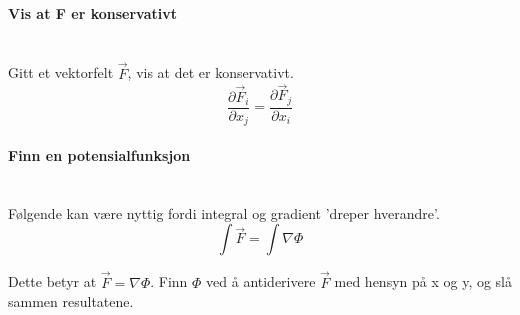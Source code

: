 \paragraph{Vis at F er konservativt} \mbox{} \\
Gitt et vektorfelt $\vec{F}$, vis at det er konservativt.
$$\frac{\partial\vec{F}_i}{\partial x_j}
    = \frac{\partial\vec{F}_j}{\partial x_i}$$



\paragraph{Finn en potensialfunksjon} \mbox{} \\
Følgende kan være nyttig fordi integral og gradient 'dreper hverandre'.
$$\int\vec{F} = \int\nabla\Phi$$

Dette betyr at $\vec{F} = \nabla\Phi$.
Finn $\Phi$ ved å antiderivere $\vec{F}$ med hensyn på x og y,
og slå sammen resultatene.
